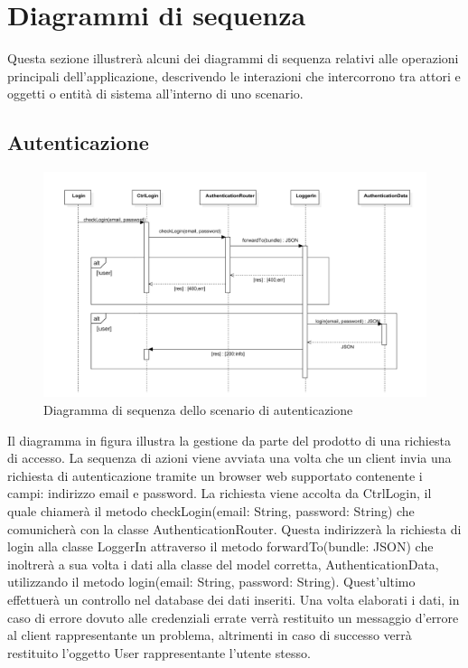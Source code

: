\documentclass[a4paper, titlepage]{article}
\begin{document}
\newpage
\section{Diagrammi di sequenza}
Questa sezione illustrerà alcuni dei diagrammi di sequenza relativi alle operazioni principali
dell'applicazione, descrivendo le interazioni che intercorrono tra attori e oggetti o entità di
sistema all'interno di uno scenario.

\subsection{Autenticazione}
\begin{figure}[!h]
	\centering
	\includegraphics[scale=0.5]{Img/seq-login.pdf}
	\caption{Diagramma di sequenza dello scenario di autenticazione}
\end{figure}
Il diagramma in figura illustra la gestione da parte del prodotto di una richiesta di accesso. La sequenza di azioni viene avviata una volta che un client invia una richiesta di autenticazione tramite un browser web supportato contenente i campi: indirizzo email e password.
La richiesta viene accolta da CtrlLogin, il quale chiamerà il metodo checkLogin(email: String, password: String) che comunicherà con la classe AuthenticationRouter. Questa indirizzerà la richiesta di login alla classe LoggerIn attraverso il metodo forwardTo(bundle: JSON) che inoltrerà a sua volta i dati alla classe del model corretta, AuthenticationData, utilizzando il metodo login(email: String, password: String). Quest'ultimo effettuerà un controllo nel database dei dati inseriti. Una volta elaborati i dati, in caso di errore dovuto alle credenziali errate verrà restituito un messaggio d'errore al client rappresentante un problema, altrimenti in caso di successo verrà restituito l'oggetto User rappresentante l'utente stesso.
\end{document}
